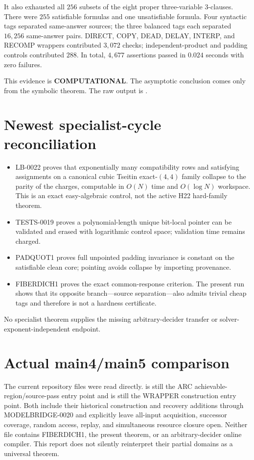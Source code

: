 \documentclass[11pt]{article}
\newcommand{\COMP}{\textbf{COMPUTATIONAL}}
\begin{document}
It also exhausted all $256$ subsets of the eight proper three-variable
3-clauses.  There were $255$ satisfiable formulas and one unsatisfiable
formula.  Four syntactic tags separated same-answer sources; the three
balanced tags each separated $16{,}256$ same-answer pairs.  DIRECT, COPY,
DEAD, DELAY, INTERP, and RECOMP wrappers contributed $3{,}072$ checks;
independent-product and padding controls contributed $288$.  In total,
$4{,}677$ assertions passed in $0.024$ seconds with zero failures.

This evidence is \COMP.  The asymptotic conclusion comes only from the
symbolic theorem.  The raw output is
.

\section{Newest specialist-cycle reconciliation}

\begin{itemize}
\item LB-0022 proves that exponentially many compatibility rows and
satisfying assignments on a canonical cubic Tseitin exact-$(4,4)$ family
collapse to the parity of the charges, computable in $O(N)$ time and
$O(\log N)$ workspace.  This is an exact easy-algebraic control, not the
active H22 hard-family theorem.
\item TESTS-0019 proves a polynomial-length unique bit-local pointer can be
validated and erased with logarithmic control space; validation time remains
charged.
\item PADQUOT1 proves full unpointed padding invariance is constant on the
satisfiable clean core; pointing avoids collapse by importing provenance.
\item FIBERDICH1 proves the exact common-response criterion.  The present run
shows that its opposite branch---source separation---also admits trivial
cheap tags and therefore is not a hardness certificate.
\end{itemize}

No specialist theorem supplies the missing arbitrary-decider transfer or
solver-exponent-independent endpoint.

\section{Actual main4/main5 comparison}

The current repository files were read directly.   is still
the ARC achievable-region/source-pass entry point and  is
still the WRAPPER construction entry point.  Both include their historical
construction and recovery additions through MODELBRIDGE-0020 and explicitly
leave all-input acquisition, successor coverage, random access, replay, and
simultaneous resource closure open.  Neither file contains FIBERDICH1, the
present theorem, or an arbitrary-decider online compiler.  This report does
not silently reinterpret their partial domains as a universal theorem.
\end{document}
